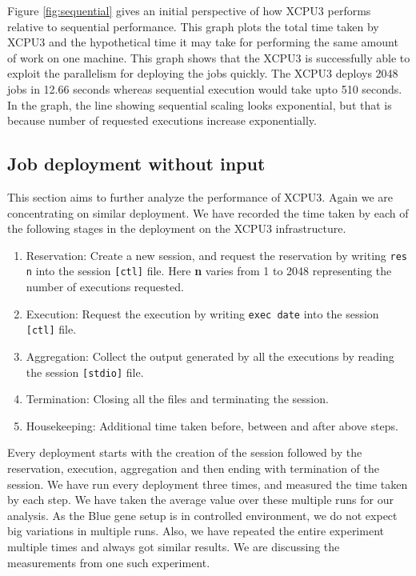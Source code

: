 Figure \ref{fig:sequential} gives an initial perspective of how XCPU3 performs
relative to sequential performance.  This graph plots the total time taken by
XCPU3 and the hypothetical time it may take for performing the same amount of
work on one machine.  This graph shows that the XCPU3 is successfully able to
exploit the parallelism for deploying the jobs quickly. The XCPU3 deploys 2048
jobs in 12.66 seconds whereas sequential execution would take upto 510 seconds.
In the graph, the line showing sequential scaling looks exponential, but that is
because number of requested executions increase exponentially.


\subsection{Job deployment without input}
This section aims to further analyze the performance of XCPU3.  Again we are 
concentrating on similar deployment.  We have recorded the time taken by each
of the following stages in the deployment on the XCPU3 infrastructure.

\begin{enumerate}
\item Reservation: Create a new session, and request the reservation by writing
\texttt{res n} into the session \texttt{[ctl]} file.  Here \textbf{n} varies
from 1 to 2048 representing the number of executions requested. 

\item Execution: Request the execution by writing \texttt{exec date} into the
session \texttt{[ctl]} file.

\item Aggregation: Collect the output generated by all the executions by reading
the session \texttt{[stdio]} file.

\item Termination: Closing all the files and terminating the session.

\item Housekeeping: Additional time taken before, between and after above steps.
\end{enumerate}
Every deployment starts with the creation of the session followed by the
reservation, execution, aggregation and then ending with termination of the
session.  We have run every deployment three times, and measured
the time taken by each step.  We have taken the average value over these
multiple runs for our analysis.  As the Blue gene setup is in controlled
environment, we do not expect big variations in multiple runs.  Also, we have
repeated the entire experiment multiple times and always got similar results.
We are discussing the measurements from one such experiment.

